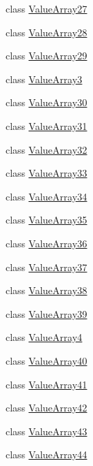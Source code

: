 \begin{DoxyCompactItemize}
\item 
class \mbox{\hyperlink{classtesting_1_1internal_1_1ValueArray27}{Value\+Array27}}
\item 
class \mbox{\hyperlink{classtesting_1_1internal_1_1ValueArray28}{Value\+Array28}}
\item 
class \mbox{\hyperlink{classtesting_1_1internal_1_1ValueArray29}{Value\+Array29}}
\item 
class \mbox{\hyperlink{classtesting_1_1internal_1_1ValueArray3}{Value\+Array3}}
\item 
class \mbox{\hyperlink{classtesting_1_1internal_1_1ValueArray30}{Value\+Array30}}
\item 
class \mbox{\hyperlink{classtesting_1_1internal_1_1ValueArray31}{Value\+Array31}}
\item 
class \mbox{\hyperlink{classtesting_1_1internal_1_1ValueArray32}{Value\+Array32}}
\item 
class \mbox{\hyperlink{classtesting_1_1internal_1_1ValueArray33}{Value\+Array33}}
\item 
class \mbox{\hyperlink{classtesting_1_1internal_1_1ValueArray34}{Value\+Array34}}
\item 
class \mbox{\hyperlink{classtesting_1_1internal_1_1ValueArray35}{Value\+Array35}}
\item 
class \mbox{\hyperlink{classtesting_1_1internal_1_1ValueArray36}{Value\+Array36}}
\item 
class \mbox{\hyperlink{classtesting_1_1internal_1_1ValueArray37}{Value\+Array37}}
\item 
class \mbox{\hyperlink{classtesting_1_1internal_1_1ValueArray38}{Value\+Array38}}
\item 
class \mbox{\hyperlink{classtesting_1_1internal_1_1ValueArray39}{Value\+Array39}}
\item 
class \mbox{\hyperlink{classtesting_1_1internal_1_1ValueArray4}{Value\+Array4}}
\item 
class \mbox{\hyperlink{classtesting_1_1internal_1_1ValueArray40}{Value\+Array40}}
\item 
class \mbox{\hyperlink{classtesting_1_1internal_1_1ValueArray41}{Value\+Array41}}
\item 
class \mbox{\hyperlink{classtesting_1_1internal_1_1ValueArray42}{Value\+Array42}}
\item 
class \mbox{\hyperlink{classtesting_1_1internal_1_1ValueArray43}{Value\+Array43}}
\item 
class \mbox{\hyperlink{classtesting_1_1internal_1_1ValueArray44}{Value\+Array44}}
\item 

\end{DoxyCompactItemize}
